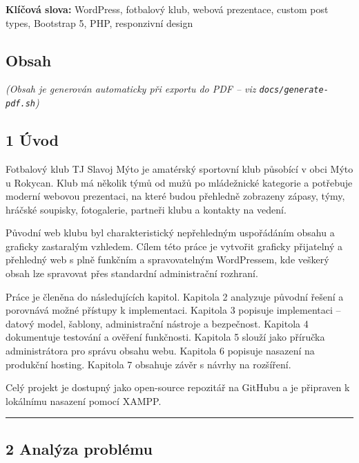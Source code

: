 \textbf{Klíčová slova:} WordPress, fotbalový klub, webová prezentace,
custom post types, Bootstrap 5, PHP, responzivní design

\newpage

\subsection{Obsah}\label{obsah}

\emph{(Obsah je generován automaticky při exportu do PDF -- viz
\texttt{docs/generate-pdf.sh})}

\newpage

\subsection{1 Úvod}\label{uxfavod}

Fotbalový klub TJ Slavoj Mýto je amatérský sportovní klub působící v
obci Mýto u Rokycan. Klub má několik týmů od mužů po mládežnické
kategorie a potřebuje moderní webovou prezentaci, na které budou
přehledně zobrazeny zápasy, týmy, hráčské soupisky, fotogalerie,
partneři klubu a kontakty na vedení.

Původní web klubu byl charakteristický nepřehledným uspořádáním obsahu a
graficky zastaralým vzhledem. Cílem této práce je vytvořit graficky
přijatelný a přehledný web s plně funkčním a spravovatelným WordPressem,
kde veškerý obsah lze spravovat přes standardní administrační rozhraní.

Práce je členěna do následujících kapitol. Kapitola 2 analyzuje původní
řešení a porovnává možné přístupy k implementaci. Kapitola 3 popisuje
implementaci -- datový model, šablony, administrační nástroje a
bezpečnost. Kapitola 4 dokumentuje testování a ověření funkčnosti.
Kapitola 5 slouží jako příručka administrátora pro správu obsahu webu.
Kapitola 6 popisuje nasazení na produkční hosting. Kapitola 7 obsahuje
závěr s návrhy na rozšíření.

Celý projekt je dostupný jako open-source repozitář na GitHubu a je
připraven k lokálnímu nasazení pomocí XAMPP.

\begin{center}\rule{0.5\linewidth}{0.5pt}\end{center}

\subsection{2 Analýza problému}\label{analuxfdza-probluxe9mu}

